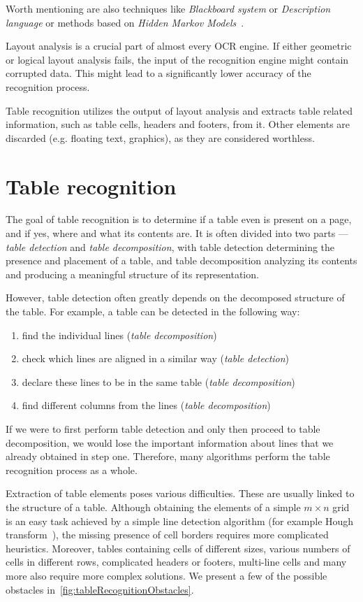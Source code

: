 Worth mentioning are also techniques like \emph{Blackboard system} or \emph{Description language} or methods based on \emph{Hidden Markov Models}~\cite{logicalLayoutOther}.

Layout analysis is a crucial part of almost every OCR engine. If either geometric or logical layout analysis fails, the input of the recognition engine might contain corrupted data. This might lead to a significantly lower accuracy of the recognition process. 

Table recognition utilizes the output of layout analysis and extracts table related information, such as table cells, headers and footers, from it. Other elements are discarded (e.g. floating text, graphics), as they are considered worthless.

\section{Table recognition}

The goal of table recognition is to determine if a table even is present on a page, and if yes, where and what its contents are. It is often divided into two parts --- \emph{table detection} and \emph{table decomposition}, with table detection determining the presence and placement of a table, and table decomposition analyzing its contents and producing a meaningful structure of its representation.

However, table detection often greatly depends on the decomposed structure of the table. For example, a table can be detected in the following way:

\begin{enumerate}
    \item find the individual lines (\emph{table decomposition})
    \item check which lines are aligned in a similar way (\emph{table detection})
    \item declare these lines to be in the same table (\emph{table decomposition})
    \item find different columns from the lines (\emph{table decomposition})
\end{enumerate}

If we were to first perform table detection and only then proceed to table decomposition, we would lose the important information about lines that we already obtained in step one. Therefore, many algorithms perform the table recognition process as a whole.

Extraction of table elements poses various difficulties. These are usually linked to the structure of a table. Although obtaining the elements of a simple $m{\times}n$ grid is an easy task achieved by a simple line detection algorithm (for example Hough transform~\cite{houghTransform}), the missing presence of cell borders requires more complicated heuristics. Moreover, tables containing cells of different sizes, various numbers of cells in different rows, complicated headers or footers, multi-line cells and many more also require more complex solutions. We present a few of the possible obstacles in~\cref{fig:tableRecognitionObstacles}.

